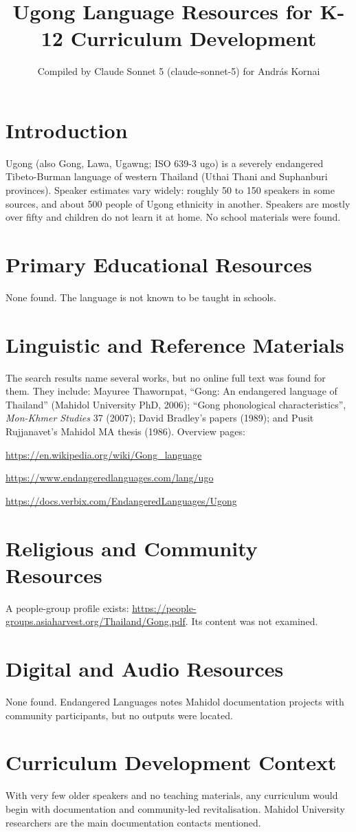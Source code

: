 \documentclass[12pt]{article}
\title{Ugong Language Resources for K-12 Curriculum Development}
\author{Compiled by Claude Sonnet 5 (claude-sonnet-5) for Andr\'as Kornai}
\date{}
\begin{document}
\maketitle

\section{Introduction}
Ugong (also Gong, Lawa, Ugawng; ISO 639-3 ugo) is a severely endangered Tibeto-Burman language of western Thailand (Uthai Thani and Suphanburi provinces). Speaker estimates vary widely: roughly 50 to 150 speakers in some sources, and about 500 people of Ugong ethnicity in another. Speakers are mostly over fifty and children do not learn it at home. No school materials were found.

\section{Primary Educational Resources}
None found. The language is not known to be taught in schools.

\section{Linguistic and Reference Materials}
The search results name several works, but no online full text was found for them. They include: Mayuree Thawornpat, ``Gong: An endangered language of Thailand'' (Mahidol University PhD, 2006); ``Gong phonological characteristics'', \emph{Mon-Khmer Studies} 37 (2007); David Bradley's papers (1989); and Pusit Rujjanavet's Mahidol MA thesis (1986). Overview pages:

\url{https://en.wikipedia.org/wiki/Gong_language}

\url{https://www.endangeredlanguages.com/lang/ugo}

\url{https://docs.verbix.com/EndangeredLanguages/Ugong}

\section{Religious and Community Resources}
A people-group profile exists: \url{https://people-groups.asiaharvest.org/Thailand/Gong.pdf}. Its content was not examined.

\section{Digital and Audio Resources}
None found. Endangered Languages notes Mahidol documentation projects with community participants, but no outputs were located.

\section{Curriculum Development Context}
With very few older speakers and no teaching materials, any curriculum would begin with documentation and community-led revitalisation. Mahidol University researchers are the main documentation contacts mentioned.
\end{document}
